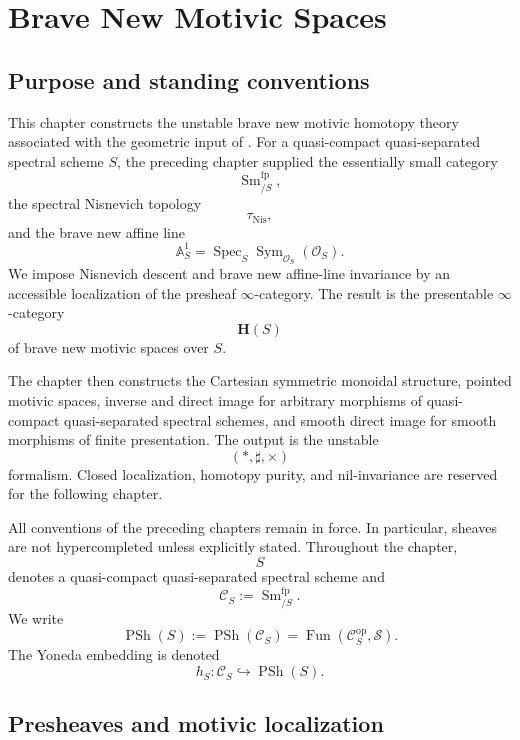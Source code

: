 \chapter{Brave New Motivic Spaces}
\label{chap:brave-new-motivic-spaces}

\section{Purpose and standing conventions}
\label{sec:brave-new-motivic-purpose}

This chapter constructs the unstable brave new motivic homotopy theory
associated with the geometric input of
.  For a quasi-compact
quasi-separated spectral scheme \(S\), the preceding chapter supplied the
essentially small category
\[
    \operatorname{Sm}^{\mathrm{fp}}_{/S},
\]
the spectral Nisnevich topology
\[
    \tau_{\mathrm{Nis}},
\]
and the brave new affine line
\[
    \mathbb A^1_S
    =
    \operatorname{Spec}_S
    \operatorname{Sym}_{\mathcal O_S}(\mathcal O_S).
\]
We impose Nisnevich descent and brave new affine-line invariance by an
accessible localization of the presheaf \(\infty\)-category.  The result
is the presentable \(\infty\)-category
\[
    \mathbf H(S)
\]
of brave new motivic spaces over \(S\).

The chapter then constructs the Cartesian symmetric monoidal structure,
pointed motivic spaces, inverse and direct image for arbitrary morphisms
of quasi-compact quasi-separated spectral schemes, and smooth direct
image for smooth morphisms of finite presentation.  The output is the
unstable
\[
    (*,\sharp,\times)
\]
formalism.  Closed localization, homotopy purity, and nil-invariance are
reserved for the following chapter.

All conventions of the preceding chapters remain in force.  In
particular, sheaves are not hypercompleted unless explicitly stated.
Throughout the chapter,
\[
    S
\]
denotes a quasi-compact quasi-separated spectral scheme and
\[
    \mathcal C_S
    :=
    \operatorname{Sm}^{\mathrm{fp}}_{/S}.
\]
We write
\[
    \operatorname{PSh}(S)
    :=
    \operatorname{PSh}(\mathcal C_S)
    =
    \operatorname{Fun}(\mathcal C_S^{\mathrm{op}},\mathcal S).
\]
The Yoneda embedding is denoted
\[
    h_S
    \colon
    \mathcal C_S
    \hookrightarrow
    \operatorname{PSh}(S).
\]

\section{Presheaves and motivic localization}
\label{sec:brave-new-motivic-localization}

